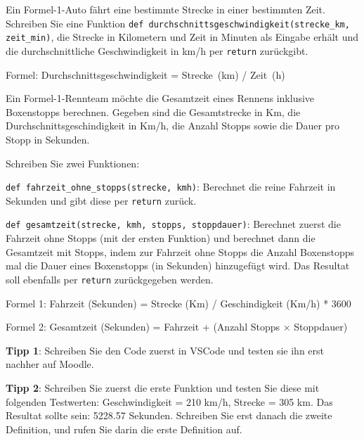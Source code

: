 \begin{myexercise}\label{ex:f1}
	Ein Formel-1-Auto fährt eine bestimmte Strecke in einer bestimmten Zeit. Schreiben Sie eine Funktion \lstinline|def durchschnittsgeschwindigkeit(strecke_km, zeit_min)|, die Strecke in Kilometern und Zeit in Minuten als Eingabe erhält und die durchschnittliche Geschwindigkeit in km/h per \lstinline|return| zurückgibt.

	Formel: Durchschnittsgeschwindigkeit = Strecke (km) / Zeit (h)

	\begin{myanswer}
		
	\end{myanswer}
\end{myexercise}

\begin{mysubmission}
	Ein Formel-1-Rennteam möchte die Gesamtzeit eines Rennens inklusive Boxenstopps berechnen. Gegeben sind die Gesamtstrecke in Km, die Durchschnittsgeschindigkeit in Km/h, die Anzahl Stopps sowie die Dauer pro Stopp in Sekunden.

	Schreiben Sie zwei Funktionen:

	\lstinline|def fahrzeit_ohne_stopps(strecke, kmh)|: Berechnet die reine Fahrzeit in Sekunden und gibt diese per \lstinline|return| zurück.

	\lstinline|def gesamtzeit(strecke, kmh, stopps, stoppdauer)|: Berechnet zuerst die Fahrzeit ohne Stopps (mit der ersten Funktion) und berechnet dann die Gesamtzeit mit Stopps, indem zur Fahrzeit ohne Stopps die Anzahl Boxenstopps mal die Dauer eines Boxenstopps (in Sekunden) hinzugefügt wird. Das Resultat soll ebenfalls per \lstinline|return| zurückgegeben werden.

	Formel 1: Fahrzeit (Sekunden) = Strecke (Km) / Geschindigkeit (Km/h) * 3600

	Formel 2: Gesamtzeit (Sekunden) = Fahrzeit + (Anzahl Stopps $\times$ Stoppdauer)

	\textbf{Tipp 1}: Schreiben Sie den Code zuerst in VSCode und testen sie ihn erst nachher auf Moodle.

	\textbf{Tipp 2}: Schreiben Sie zuerst die erste Funktion und testen Sie diese mit folgenden Testwerten: Geschwindigkeit = 210 km/h, Strecke = 305 km. Das Resultat sollte sein: 5228.57 Sekunden. Schreiben Sie erst danach die zweite Definition, und rufen Sie darin die erste Definition auf.

	\begin{myanswer}
		
	\end{myanswer}
\end{mysubmission}

